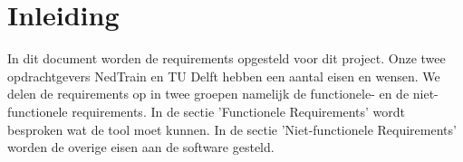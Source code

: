 \section{Inleiding}
In dit document worden de requirements opgesteld voor dit project. Onze twee opdrachtgevers NedTrain en TU Delft hebben een aantal eisen en wensen. We delen de requirements op in twee groepen namelijk de functionele- en de niet-functionele requirements. In de sectie 'Functionele Requirements' wordt besproken wat de tool moet kunnen. In de sectie 'Niet-functionele Requirements' worden de overige eisen aan de software gesteld. 
